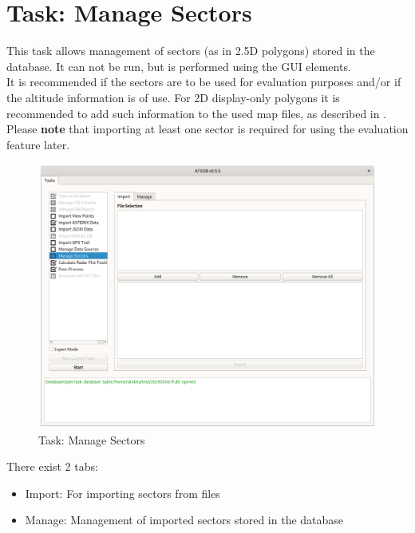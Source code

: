 \section{Task: Manage Sectors}
\label{sec:task_manage_sectors} 

This task allows management of sectors (as in 2.5D polygons) stored in the database. It can not be run, but is performed using the GUI elements. \\

It is recommended if the sectors are to be used for evaluation purposes and/or if the altitude information is of use. For 2D display-only polygons it is recommended to add such information to the used map files, as described in . \\

Please \textbf{note} that importing at least one sector is required for using the evaluation feature later.

\begin{figure}[H]
  \hspace*{-2.5cm}
    \includegraphics[width=19cm]{figures/manage_sectors.png}
  \caption{Task: Manage Sectors}
\end{figure}

There exist 2 tabs:

\begin{itemize}  
\item Import: For importing sectors from files
\item Manage: Management of imported sectors stored in the database
\end{itemize}
\ \\

